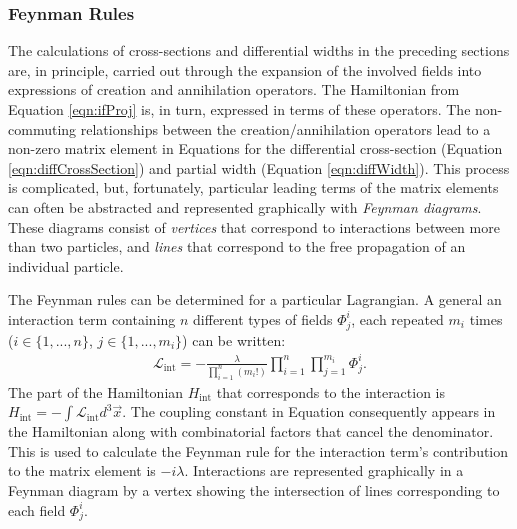 \subsubsection{Feynman Rules}\label{sec:feynmanRules}
The calculations of cross-sections and differential widths in the preceding sections are, in principle, carried out through the expansion of the involved fields into expressions of creation and annihilation operators.
The Hamiltonian from Equation \ref{eqn:ifProj} is, in turn, expressed in terms of these operators. 
The non-commuting relationships between the creation/annihilation operators lead to a non-zero matrix element in Equations for the differential cross-section (Equation \ref{eqn:diffCrossSection}) and partial width (Equation \ref{eqn:diffWidth}).
This process is complicated, but, fortunately, particular leading terms of the matrix elements can often be abstracted and represented graphically with \emph{Feynman diagrams}.
These diagrams consist of \emph{vertices} that correspond to interactions between more than two particles, and \emph{lines} that correspond to the free propagation of an individual particle.

The Feynman rules can be determined for a particular Lagrangian.
A general an interaction term containing $n$ different types of fields $\Phi^i_j$, each repeated $m_i$ times ($i\in\{1,...,n\}$, $j\in\{1,...,m_i\}$) can be written:
\begin{equation}\begin{split}\label{eqn:feynmanRuleInt}
\mathcal{L}_\text{int}=-\frac{\lambda}{\prod_{i=1}^n (m_i!)}\prod_{i=1}^n\prod_{j=1}^{m_i}\Phi^i_j.
\end{split}\end{equation} 
The part of the Hamiltonian $H_\text{int}$ that corresponds to the interaction is $H_\text{int}=-\int\mathcal{L}_\text{int}d^3\vec{x}$.
The coupling constant in Equation \label{eqn:feynmanRuleInt} consequently appears in the Hamiltonian along with combinatorial factors that cancel the denominator. 
This is used to calculate the Feynman rule for the interaction term's contribution to the matrix element is $-i\lambda$.
Interactions are represented graphically in a Feynman diagram by a vertex showing the intersection of lines corresponding to each field $\Phi^i_j$.

